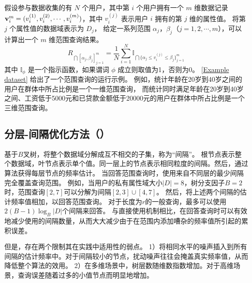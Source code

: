 假设参与数据收集的有 $N$ 个用户，其中第 $i$ 个用户拥有一个 $m$ 维数据记录 ${\bf{v}}^{m}_i = (v^{(1)}_i, v^{(2)}_i, \cdots, v^{(m)}_i)$，其中 $v_i^{(j)}$ 表示用户 $i$ 拥有的第 $j$ 维的属性值。
将第 $j$ 个属性值的数据域表示为 $D_j$，
给定一系列范围 $\alpha_j$，$\beta_j$（$j=1,2,\cdots,m$），可以计算出一个 $m$ 维范围查询结果。
\begin{equation}
    R_{\bigcap {[\alpha_j,\beta_j]}_{j=1}^{m}}=\frac{1}{N} \sum_{i=1}^{N} \mathbb{I}_{\bigcap{\{\alpha_j \leq v_i^{(j)} \leq \beta_j\}_{j=1}^{m}}}
\end{equation}
其中 $\mathbb{I}_\phi$ 是一个指示函数，如果谓词 $\phi$ 成立则取值为1，否则为0。
\autoref{Example dataset} 给出了一个范围查询的运行示例。
例如，统计年龄在20岁到40岁之间的用户在群体中所占比例是一个一维范围查询，
而统计同时满足年龄在20岁到40岁之间、工资低于5000元和已贷款金额低于20000元的用户在群体中所占比例是一个三维范围查询。

\subsection{分层-间隔优化方法（\myhio）}
\label{exsitingHIO}
基于$B$叉树，\myhio \cite{wang2019answering}将整个数据域分解成互不相交的子集，称为“间隔”。
根节点表示整个数据域，叶节点表示单个值。同一层上的节点表示相同粒度的间隔。然后，\myhio 通过\oue \cite{wang2017locally}算法获得每层节点的频率估计。
当回答范围查询时，\myhio 使用来自不同层的最少间隔完全覆盖查询范围。
例如，当用户的私有属性域大小$|D|=8$，树分支因子$B=2$时，范围查询$[2,7]$可以分解为间隔$[2,3] \cup [4,7]$。
然后，\myhio 将上述两个间隔的估计频率值相加，以回答范围查询。
对于长度为$r$的一般查询，\myhio 最多可以使用$2(B-1)\log_B|D|$个间隔来回答。
与直接使用\fo 机制相比，\myhio 在回答查询时可以有效地减少使用的间隔数量，从而大大减少由于在范围内添加嘈杂的频率值所引起的累积误差。

但是，\myhio 存在两个限制其在实践中适用性的弱点。
1）\myhio 将相同水平的噪声插入到所有间隔的估计频率中。对于间隔较小的节点，扰动噪声往往会掩盖真实频率值，从而降低整个算法的效用。
2）在多维场景中，树层数随维数指数增加。对于高维场景，查询误差随着过多的小值节点而明显地增加。

